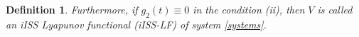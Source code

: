 \documentclass[onecolumn]{autart}
\newtheorem{definition}{Definition}
\newenvironment{proof of Prop.ODE}{{\it Proof of Proposition~\ref{Prop.ODE}:\enspace}}{\hfill $\blacksquare$\par}
\newenvironment{proof of PDE}{{\it Proof of Proposition \ref{Prop.8}:\enspace}}{\hfill $\blacksquare$\par}
\begin{document}
{\begin{definition}
	{Furthermore, if $g_2(t)\equiv 0$ in the condition (ii), then $V$ is called an  iISS Lyapunov functional (iISS-LF) of system \eqref{systems}.}
\end{definition}

}
\end{document}
